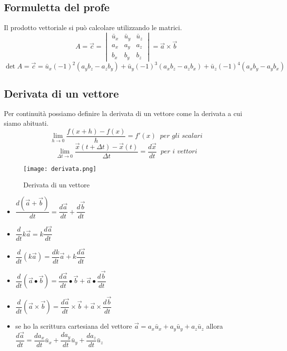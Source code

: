 \documentclass[../../main.tex]{subfiles}
\begin{document}
\subsection{Formuletta del profe}
Il prodotto vettoriale si può calcolare utilizzando le matrici.
\[
    A = \vec{c} = \begin{vmatrix}
        \bar{u}_x & \bar{u}_y & \bar{u}_z \\
        a_x & a_y & a_z \\
        b_x & b_y & b_z
    \end{vmatrix} = \vec{a} \times \vec{b}
\]
\[
    \det{A} = \vec{c} = \bar{u}_x(-1)^2(a_yb_z - a_zb_y) + \bar{u}_y(-1)^3(a_xb_z - a_zb_x) + \bar{u}_z(-1)^4(a_xb_y - a_yb_x)
\]

\subsection{Derivata di un vettore}
Per continuità possiamo definire la derivata di un vettore come la derivata a cui siamo abituati.
\[
    \lim_{h \to 0} \dfrac{f(x+h) - f(x)}{h} = f'(x) \ \textit{ per gli scalari}
\]
\[
    \lim_{\Delta t \to 0} \dfrac{\vec{x}(t + \Delta t) - \vec{x}(t)}{\Delta t} = \dfrac{d\vec{x}}{dt} \ \textit{ per i vettori}
\]
\begin{figure}[h!]
    \centering
    \texttt{[image: derivata.png]}
    \caption{Derivata di un vettore}
\end{figure}

\begin{itemize}
    \item $\dfrac{d(\vec{a} + \vec{b})}{dt} = \dfrac{d\vec{a}}{dt} + \dfrac{d\vec{b}}{dt}$
    \item $\dfrac{d}{dt} k\vec{a} = k\dfrac{d\vec{a}}{dt}$
    \item $\dfrac{d}{dt} (k\vec{a}) = \dfrac{dk}{dt}\vec{a} + k\dfrac{d\vec{a}}{dt}$
    \item $\dfrac{d}{dt} (\vec{a} \bullet \vec{b}) = \dfrac{d\vec{a}}{dt} \bullet \vec{b} + \vec{a} \bullet \dfrac{d\vec{b}}{dt}$
    \item $\dfrac{d}{dt} (\vec{a} \times \vec{b}) = \dfrac{d\vec{a}}{dt} \times \vec{b} + \vec{a} \times \dfrac{d\vec{b}}{dt}$
    \item se ho la scrittura cartesiana del vettore $\vec{a} = a_x\bar{u}_x + a_y\bar{u}_y + a_z\bar{u}_z$ allora $\dfrac{d\vec{a}}{dt} = \dfrac{da_x}{dt}\bar{u}_x + \dfrac{da_y}{dt}\bar{u}_y + \dfrac{da_z}{dt}\bar{u}_z$
\end{itemize}
\end{document}

